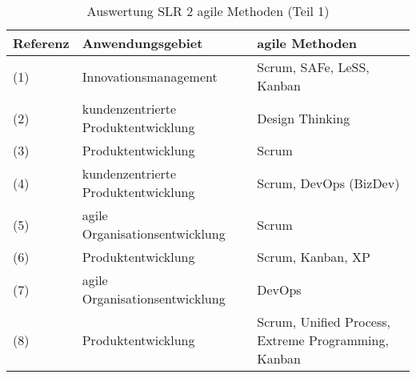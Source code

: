 \begin{sidewaystable}[ht]
	\centering
	\caption[Auswertung SLR 2 agile Methoden (Teil 1)]{Auswertung SLR 2 agile Methoden (Teil 1) \protect \footnotemark}
	\begin{tabular}{|l|p{8cm}|p{8cm}|}
		\hline
		\textbf{Referenz}                                            & \textbf{Anwendungsgebiet}                                                                                                &\textbf{agile Methoden}                                                                       \\
		\hline                                                               
		(1)                                  & Innovationsmanagement                                                                                              & Scrum, SAFe, LeSS, Kanban                                                                        \\
		(2)     & kundenzentrierte Produktentwicklung                                                                                & Design Thinking                                                                                  \\
		(3)                            & Produktentwicklung                                                                                                 & Scrum                                                                                            \\
		(4)                               & kundenzentrierte Produktentwicklung                                                                                & Scrum, DevOps (BizDev)                                                                           \\
		(5) & agile Organisationsentwicklung & Scrum \\
		(6)                                    & Produktentwicklung                                                                                                 & Scrum, Kanban, XP                                                                                \\
		(7)                & agile Organisationsentwicklung                                                                                     & DevOps                                                                                           \\
		(8) & Produktentwicklung                                                                                                 & Scrum, Unified Process, Extreme Programming, Kanban                                              \\

\end{tabular}
\end{sidewaystable}
